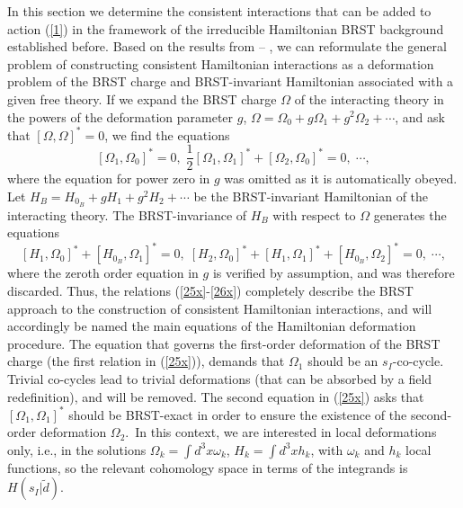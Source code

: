 \documentclass[a4paper,12pt]{article}
\begin{document}
In this section we determine the consistent interactions that can be added
to action (\ref{1}) in the framework of the irreducible Hamiltonian BRST
background established before. Based on the results from \cite{25}--\cite{28}%
, we can reformulate the general problem of constructing consistent
Hamiltonian interactions as a deformation problem of the BRST charge and
BRST-invariant Hamiltonian associated with a given free theory. If we expand
the BRST charge $\Omega $ of the interacting theory in the powers of the
deformation parameter $g$, $\Omega =\Omega _{0}+g\Omega _{1}+g^{2}\Omega
_{2}+\cdots $, and ask that $\left[ \Omega ,\Omega \right] ^{*}=0$, we find
the equations 
\begin{equation}
\left[ \Omega _{1},\Omega _{0}\right] ^{*}=0,\;\frac{1}{2}\left[ \Omega
_{1},\Omega _{1}\right] ^{*}+\left[ \Omega _{2},\Omega _{0}\right]
^{*}=0,\;\cdots ,  \label{25x}
\end{equation}
where the equation for power zero in $g$ was omitted as it is automatically
obeyed. Let $H_{B}=H_{0_{B}}+gH_{1}+g^{2}H_{2}+\cdots $ be the
BRST-invariant Hamiltonian of the interacting theory. The BRST-invariance of 
$H_{B}$ with respect to $\Omega $ generates the equations 
\begin{equation}
\left[ H_{1},\Omega _{0}\right] ^{*}+\left[ H_{0_{B}},\Omega _{1}\right]
^{*}=0,\;\left[ H_{2},\Omega _{0}\right] ^{*}+\left[ H_{1},\Omega
_{1}\right] ^{*}+\left[ H_{0_{B}},\Omega _{2}\right] ^{*}=0,\;\cdots ,
\label{26x}
\end{equation}
where the zeroth order equation in $g$ is verified by assumption, and was
therefore discarded. Thus, the relations (\ref{25x}-\ref{26x}) completely
describe the BRST approach to the construction of consistent Hamiltonian
interactions, and will accordingly be named the main equations of the
Hamiltonian deformation procedure. The equation that governs the first-order
deformation of the BRST charge (the first relation in (\ref{25x})), demands
that $\Omega _{1}$ should be an $s_{I}$-co-cycle. Trivial co-cycles lead to
trivial deformations (that can be absorbed by a field redefinition), and
will be removed. The second equation in (\ref{25x}) asks that $\left[ \Omega
_{1},\Omega _{1}\right] ^{*}$ should be BRST-exact in order to ensure the
existence of the second-order deformation $\Omega _{2}$.\ In this context,
we are interested in local deformations only, i.e., in the solutions $\Omega
_{k}=\int d^{3}x\omega _{k}$, $H_{k}=\int d^{3}xh_{k}$, with $\omega _{k}$
and $h_{k}$ local functions, so the relevant cohomology space in terms of
the integrands is $H\left( s_{I}|\tilde{d}\right) $.
\end{document}
